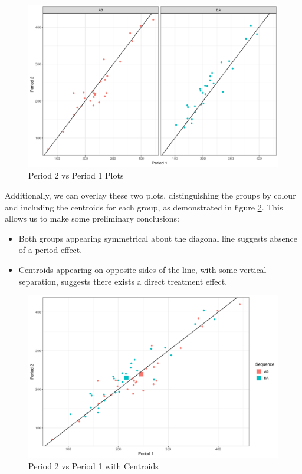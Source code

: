 \documentclass[12pt, TexShade, letterpaper]{report}
\begin{document}
\begin{figure}[H]
    \centering
    \includegraphics[width=0.85\linewidth]{report/figures/ch2/periodsPlot.png}
    \caption{Period 2 vs Period 1 Plots}
    \label{fig:period2vsperiod1}
\end{figure}

Additionally, we can overlay these two plots, distinguishing the groups by colour and including the centroids for each group, as demonstrated in figure \ref{fig:centroids}. This allows us to make some preliminary conclusions:
\begin{itemize}
    \item Both groups appearing symmetrical about the diagonal line suggests absence of a period effect.
    \item Centroids appearing on opposite sides of the line, with some vertical separation, suggests there exists a direct treatment effect.
\end{itemize}

\begin{figure}[H]
    \centering
    \includegraphics[height=0.55\textheight]{report/figures/ch2/centroidsPlot.png}
    \caption{Period 2 vs Period 1 with Centroids}
    \label{fig:centroids}
\end{figure}
\end{document}
